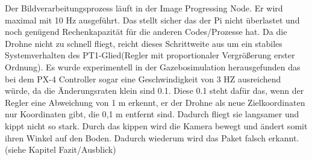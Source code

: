 Der Bildverarbeitungsprozess läuft in der Image Progressing Node. Er wird maximal mit 10 Hz ausgeführt. Das stellt sicher das der Pi nicht überlastet und noch genügend Rechenkapazität für die anderen Codes/Prozesse hat. Da die Drohne nicht zu schnell fliegt, reicht dieses Schrittweite aus um ein stabiles Systemverhalten des PT1-Glied(Regler mit proportionaler Vergrößerung erster Ordnung). Es wurde experimentell in der Gazebosimulation herausgefunden das bei dem PX-4 Controller sogar eine Geschwindigkeit von 3 HZ ausreichend würde, da die Änderungsraten klein sind 0.1. Diese 0.1 steht dafür das, wenn der Regler eine Abweichung von 1 m erkennt, er der Drohne als neue Zielkoordinaten nur Koordinaten gibt, die 0,1 m entfernt sind. Dadurch fliegt sie langsamer und kippt nicht so stark. Durch das kippen wird die Kamera bewegt und ändert somit ihren Winkel auf den Boden. Dadurch wiederum wird das Paket falsch erkannt. (siehe Kapitel Fazit/Ausblick) 